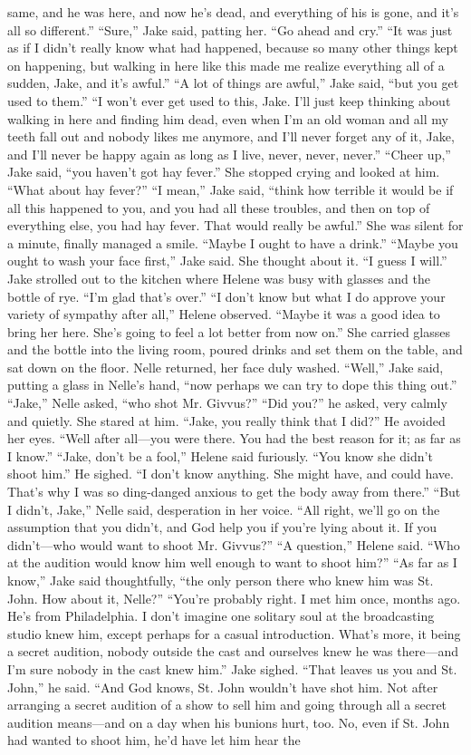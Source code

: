 \documentclass{novel}
\begin{document}
same, and he was here, and now he’s dead, and everything of his is gone, and it’s all so different.” “Sure,” Jake said, patting her. “Go ahead and cry.” “It was just as if I didn’t really know what had happened, because so many other things kept on happening, but walking in here like this made me realize everything all of a sudden, Jake, and it’s awful.” “A lot of things are awful,” Jake said, “but you get used to them.” “I won’t ever get used to this, Jake. I’ll just keep thinking about walking in here and finding him dead, even when I'm an old woman and all my teeth fall out and nobody likes me anymore, and I’ll never forget any of it, Jake, and I'll never be happy again as long as I live, never, never, never.” “Cheer up,” Jake said, “you haven’t got hay fever.” She stopped crying and looked at him. “What about hay fever?” “I mean,” Jake said, “think how terrible it would be if all this happened to you, and you had all these troubles, and then on top of everything else, you had hay fever. That would really be awful.” She was silent for a minute, finally managed a smile. “Maybe I ought to have a drink.” “Maybe you ought to wash your face first,” Jake said. She thought about it. “I guess I will.” Jake strolled out to the kitchen where Helene was busy with glasses and the bottle of rye. “I’m glad that’s over.” “I don’t know but what I do approve your variety of sympathy after all,” Helene observed. “Maybe it was a good idea to bring her here. She’s going to feel a lot better from now on.” She carried glasses and the bottle into the living room, poured drinks and set them on the table, and sat down on the floor. Nelle returned, her face duly washed. “Well,” Jake said, putting a glass in Nelle’s hand, “now perhaps we can try to dope this thing out.” “Jake,” Nelle asked, “who shot Mr. Givvus?” “Did you?” he asked, very calmly and quietly. She stared at him. “Jake, you really think that I did?” He avoided her eyes. “Well after all—you were there. You had the best reason for it; as far as I know.” “Jake, don’t be a fool,” Helene said furiously. “You know she didn’t shoot him.” He sighed. “I don’t know anything. She might have, and could have. That’s why I was so ding-danged anxious to get the body away from there.” “But I didn’t, Jake,” Nelle said, desperation in her voice. “All right, we’ll go on the assumption that you didn’t, and God help you if you’re lying about it. If you didn’t—who would want to shoot Mr. Givvus?” “A question,” Helene said. “Who at the audition would know him well enough to want to shoot him?” “As far as I know,” Jake said thoughtfully, “the only person there who knew him was St. John. How about it, Nelle?” “You’re probably right. I met him once, months ago. He’s from Philadelphia. I don’t imagine one solitary soul at the broadcasting studio knew him, except perhaps for a casual introduction. What’s more, it being a secret audition, nobody outside the cast and ourselves knew he was there—and I’m sure nobody in the cast knew him.” Jake sighed. “That leaves us you and St. John,” he said. “And God knows, St. John wouldn’t have shot him. Not after arranging a secret audition of a show to sell him and going through all a secret audition means—and on a day when his bunions hurt, too. No, even if St. John had wanted to shoot him, he’d have let him hear the 
\end{document}

